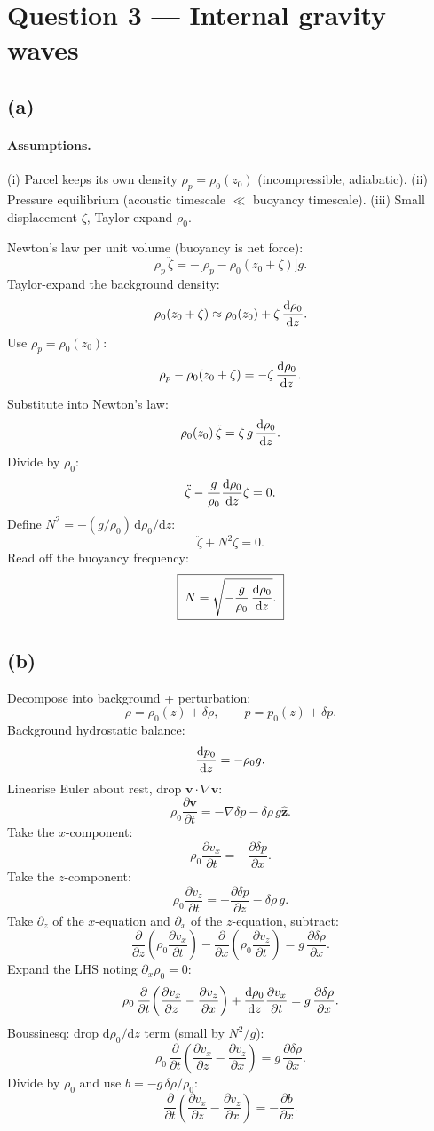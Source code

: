 \documentclass[11pt]{article}
\newcommand{\de}{\mathrm{d}}
\newcommand{\pd}[2]{\frac{\partial #1}{\partial #2}}
\begin{document}
\section*{Question 3 --- Internal gravity waves}

\subsection*{(a)}

\paragraph{Assumptions.} (i) Parcel keeps its own density $\rho_{p}=\rho_{0}(z_{0})$ (incompressible, adiabatic). (ii) Pressure equilibrium (acoustic timescale $\ll$ buoyancy timescale). (iii) Small displacement $\zeta$, Taylor-expand $\rho_{0}$.

Newton's law per unit volume (buoyancy is net force):
\[ \rho_{p}\,\ddot\zeta = -\bigl[\rho_{p} - \rho_{0}(z_{0}+\zeta)\bigr]g. \]
Taylor-expand the background density:
\[ \rho_{0}(z_{0}+\zeta) \approx \rho_{0}(z_{0}) + \zeta\,\dv{\rho_{0}}{z}. \]
Use $\rho_{p}=\rho_{0}(z_{0})$:
\[ \rho_{p} - \rho_{0}(z_{0}+\zeta) = -\zeta\,\dv{\rho_{0}}{z}. \]
Substitute into Newton's law:
\[ \rho_{0}(z_{0})\,\ddot\zeta = \zeta\,g\,\dv{\rho_{0}}{z}. \]
Divide by $\rho_{0}$:
\[ \ddot\zeta - \frac{g}{\rho_{0}}\dv{\rho_{0}}{z}\zeta = 0. \]
Define $N^{2} = -(g/\rho_{0})\,\de\rho_{0}/\de z$:
\[ \ddot\zeta + N^{2}\zeta = 0. \]
Read off the buoyancy frequency:
\[ \boxed{\;N = \sqrt{-\frac{g}{\rho_{0}}\,\dv{\rho_{0}}{z}}.\;} \]

\subsection*{(b)}

Decompose into background + perturbation:
\[ \rho = \rho_{0}(z) + \delta\rho,\qquad p = p_{0}(z) + \delta p. \]
Background hydrostatic balance:
\[ \dv{p_{0}}{z} = -\rho_{0}g. \]
Linearise Euler about rest, drop $\bm v\cdot\nabla\bm v$:
\[ \rho_{0}\pd{\bm v}{t} = -\nabla\delta p - \delta\rho\,g\hat{\bm z}. \]
Take the $x$-component:
\[ \rho_{0}\pd{v_{x}}{t} = -\pd{\delta p}{x}. \]
Take the $z$-component:
\[ \rho_{0}\pd{v_{z}}{t} = -\pd{\delta p}{z} - \delta\rho\,g. \]
Take $\partial_{z}$ of the $x$-equation and $\partial_{x}$ of the $z$-equation, subtract:
\[ \pd{}{z}\!\left(\rho_{0}\pd{v_{x}}{t}\right) - \pd{}{x}\!\left(\rho_{0}\pd{v_{z}}{t}\right) = g\,\pd{\delta\rho}{x}. \]
Expand the LHS noting $\partial_{x}\rho_{0}=0$:
\[ \rho_{0}\,\pd{}{t}\!\left(\pd{v_{x}}{z} - \pd{v_{z}}{x}\right) + \dv{\rho_{0}}{z}\pd{v_{x}}{t} = g\,\pd{\delta\rho}{x}. \]
Boussinesq: drop $\de\rho_{0}/\de z$ term (small by $N^{2}/g$):
\[ \rho_{0}\,\pd{}{t}\!\left(\pd{v_{x}}{z} - \pd{v_{z}}{x}\right) = g\,\pd{\delta\rho}{x}. \]
Divide by $\rho_{0}$ and use $b = -g\,\delta\rho/\rho_{0}$:
\[ \boxed{\;\pd{}{t}\!\left(\pd{v_{x}}{z} - \pd{v_{z}}{x}\right) = -\pd{b}{x}.\;} \]
\end{document}
